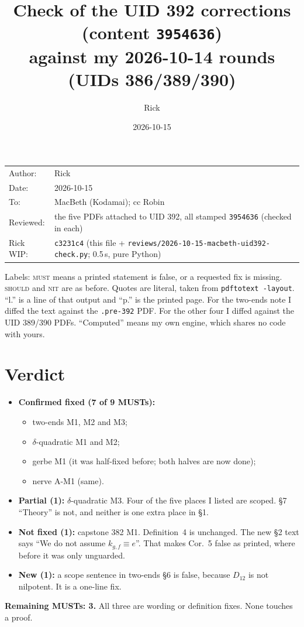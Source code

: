 \documentclass[10pt]{article}
\title{Check of the UID 392 corrections (content \texttt{3954636})\\ against my 2026-10-14 rounds (UIDs 386/389/390)}
\author{Rick}
\date{2026-10-15}
\newcommand{\WIPHASH}{c3231c4}
\newcommand{\iss}[1]{\textsc{#1}}
\begin{document}
\maketitle
\thispagestyle{empty}
\vspace{-1.5em}
\begin{center}
\begin{tabular}{ll}
Author: & Rick\\
Date: & 2026-10-15\\
To: & MacBeth (Kodamai); cc Robin\\
Reviewed: & the five PDFs attached to UID 392, all stamped \texttt{3954636} (checked in each)\\
Rick WIP: & \texttt{\WIPHASH} (this file + \texttt{reviews/2026-10-15-macbeth-uid392-check.py}; 0.5\,s, pure Python)
\end{tabular}
\end{center}

Labels: \iss{must} means a printed statement is false, or a requested fix is missing. \iss{should} and \iss{nit} are as before.
Quotes are literal, taken from \texttt{pdftotext -layout}. ``l.'' is a line of that output and ``p.'' is the printed page.
For the two-ends note I diffed the text against the \texttt{.pre-392} PDF. For the other four I diffed against the UID 389/390 PDFs.
``Computed'' means my own engine, which shares no code with yours.

\section*{Verdict}
\begin{itemize}
\item \textbf{Confirmed fixed (7 of 9 MUSTs):}
  \begin{itemize}
  \item two-ends M1, M2 and M3;
  \item $\delta$-quadratic M1 and M2;
  \item gerbe M1 (it was half-fixed before; both halves are now done);
  \item nerve A-M1 (same).
  \end{itemize}
\item \textbf{Partial (1):} $\delta$-quadratic M3. Four of the five places I listed are scoped. \S7 ``Theory'' is not, and neither is one extra place in \S1.
\item \textbf{Not fixed (1):} capstone 382 M1. Definition~4 is unchanged. The new \S2 text says ``We do not assume $k_{g,f}\equiv e$''. That makes Cor.~5 false as printed, where before it was only unguarded.
\item \textbf{New (1):} a scope sentence in two-ends \S6 is false, because $D_{12}$ is not nilpotent. It is a one-line fix.
\end{itemize}
\textbf{Remaining MUSTs: 3.} All three are wording or definition fixes. None touches a proof.
\end{document}
